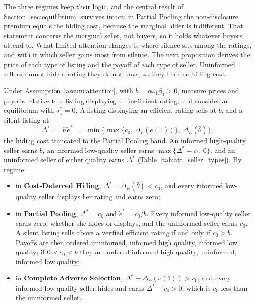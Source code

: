 The three regimes keep their logic, and the central result of Section~\ref{sec:equilibrium} survives intact: in Partial Pooling the non-disclosure premium equals the hiding cost, because the marginal hider is indifferent. That statement concerns the marginal seller, not buyers, so it holds whatever buyers attend to. What limited attention changes is where silence sits among the ratings, and with it which seller gains most from silence. The next proposition derives the price of each type of listing and the payoff of each type of seller. Uninformed sellers cannot hide a rating they do not have, so they bear no hiding cost.

\begin{proposition}
\label{prop:att_seller_types}
Under Assumption~\ref{assum:attention}, with $b=\rho\omega_1\beta_1>0$, measure prices and payoffs relative to a listing displaying an inefficient rating, and consider an equilibrium with $\sigma_1^*=0$. A listing displaying an efficient rating sells at $b$, and a silent listing at
\begin{equation}
    \Delta^*\;=\;b\,\tilde e^*\;=\;\min\Big\{\max\big\{c_0,\,\Delta_\psi(e(1))\big\},\;\Delta_\psi(\bar\theta)\Big\},
    \label{eq:att_premium_trunc}
\end{equation}
the hiding cost truncated to the Partial Pooling band. An informed high-quality seller earns $b$, an informed low-quality seller earns $\max\{\Delta^*-c_0,\,0\}$, and an uninformed seller of either quality earns $\Delta^*$ (Table~\ref{tab:att_seller_types}). By regime:
\begin{itemize}
    \item in \textbf{Cost-Deterred Hiding}, $\Delta^*=\Delta_\psi(\bar\theta)<c_0$, and every informed low-quality seller displays her rating and earns zero;
    \item in \textbf{Partial Pooling}, $\Delta^*=c_0$ and $\tilde e^*=c_0/b$. Every informed low-quality seller earns zero, whether she hides or displays, and the uninformed seller earns $c_0$. A silent listing sells above a verified efficient rating if and only if $c_0>b$. Payoffs are then ordered uninformed, informed high quality, informed low quality; if $0<c_0<b$ they are ordered informed high quality, uninformed, informed low quality;
    \item in \textbf{Complete Adverse Selection}, $\Delta^*=\Delta_\psi(e(1))>c_0$, and every informed low-quality seller hides and earns $\Delta^*-c_0>0$, which is $c_0$ less than the uninformed seller.

\end{itemize}
\end{proposition}
